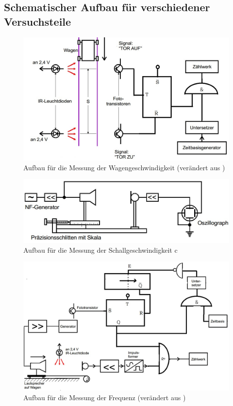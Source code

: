 \subsection{Schematischer Aufbau für verschiedener Versuchsteile}
\begin{figure}[!h]
  \centering
  \includegraphics[scale=0.5]{Grafiken/V104_Abb1.jpg}
  \caption{Aufbau für die Messung der Wagengeschwindigkeit (verändert aus \cite{V104})}
  \label{fig:V104_Abb1}
\end{figure}
\begin{figure}[!h]
  \centering
  \includegraphics[width=1\textwidth]{Grafiken/V104_Abb2.jpg}
  \caption{Aufbau für die Messung der Schallgeschwindigkeit c  \cite{V104}}
  \label{fig:V104_Abb2}
\end{figure}
\begin{figure}[!h]
  \centering
  \includegraphics[scale=0.5]{Grafiken/V104_Abb3.jpg}
  \caption{Aufbau für die Messung der Frequenz (verändert aus \cite{V104})}
  \label{fig:V104_Abb3}
\end{figure}
